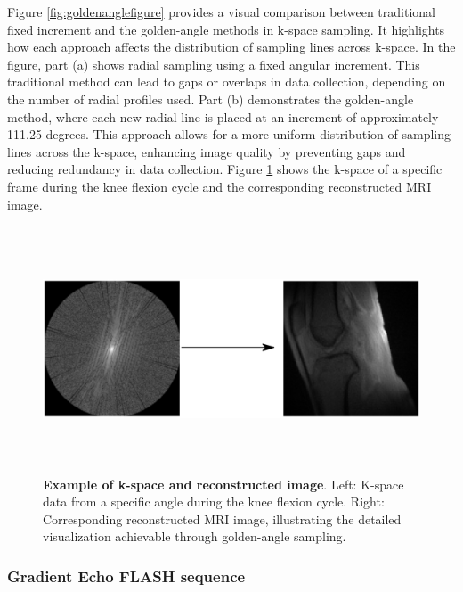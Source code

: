 \documentclass{micro-econ-thesis}
\begin{document}
 
Figure \ref{fig:goldenanglefigure} provides a visual comparison between traditional fixed increment and the golden-angle methods in k-space sampling. It highlights how each approach affects the distribution of sampling lines across k-space. In the figure, part (a) shows radial sampling using a fixed angular increment. This traditional method can lead to gaps or overlaps in data collection, depending on the number of radial profiles used. Part (b) demonstrates the golden-angle method, where each new radial line is placed at an increment of approximately 111.25 degrees. This approach allows for a more uniform distribution of sampling lines across the k-space, enhancing image quality by preventing gaps and reducing redundancy in data collection. Figure \ref{fig:kspacearrow}  shows the k-space of a specific frame during the knee flexion cycle and the corresponding reconstructed MRI image.
\begin{figure}[H]
	\centering
	\includegraphics[width=0.9\linewidth, height=7.3cm]{kspace_arrow}
	\caption{\textbf{Example of k-space and reconstructed image}. Left: K-space data from a specific angle during the knee flexion cycle. Right: Corresponding reconstructed MRI image, illustrating the detailed visualization achievable through golden-angle sampling.}
	\label{fig:kspacearrow}
\end{figure}
  
\subsubsection{Gradient Echo FLASH sequence}
\end{document}
